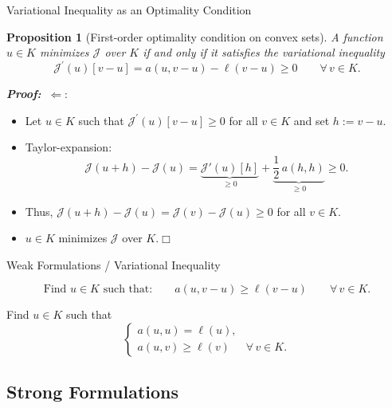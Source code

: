 \documentclass[10pt,aspectratio=169]{beamer}
\newtheorem{proposition}{Proposition}[section]
\def\cJ{{\mathcal J}}
\def\eop{\hfill{$\Box$}}
\begin{document}
\begin{frame}{Variational Inequality as an Optimality Condition}
	\begin{proposition}[First-order optimality condition on convex sets]
		A function $u\in K$ minimizes $\cJ$ over $K$ if and only if it satisfies the variational inequality
		\begin{equation*}
			\cJ^\prime(u)[v-u] =  a(u,v-u)-\ell(v-u) \ge 0\qquad\forall\, v\in K.
		\end{equation*}
	\end{proposition}
	\textbf{\em Proof:} $\ \Longleftarrow:$
	\begin{itemize}
		\item Let $u\in K$ such that  $\cJ^\prime(u)[v-u]\ge 0$ for all $v\in K$ and set $h:= v-u$.
		\item Taylor-expansion:
		      \begin{equation*}
			      \cJ(u+h)-\cJ(u)=\underbrace{\cJ'(u)[h]}_{\ge 0}+\underbrace{\frac12\,a(h,h)}_{\ge 0} \ge 0.
		      \end{equation*}
		\item Thus, $\cJ(u+h)-\cJ(u) = \cJ(v)-\cJ(u)\ge 0$ for all $v\in K$.
		\item $u\in K$ minimizes $\cJ$ over $K$.\eop
	\end{itemize}
\end{frame}

\begin{frame}{Weak Formulations / Variational Inequality}
	\begin{problem}
	\begin{equation*}
		\text{Find }u\in K\text{ such that:}\qquad a(u,v-u)\ge \ell(v-u)\qquad \forall\, v\in K.
	\end{equation*}
	\end{problem}

	\begin{problem}
	Find $u\in K$ such that
	\begin{equation*}
		\begin{cases}
			a(u,u) = \ell(u), &                   \\[2pt]
			a(u,v)\ge \ell(v) & \forall\, v\in K.
		\end{cases}
	\end{equation*}
	\end{problem}
\end{frame}

\subsection{Strong Formulations}
\end{document}
